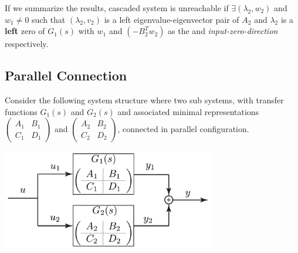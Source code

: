 \documentclass[twoside]{article}
\begin{document}
If we summarize the results, cascaded system is unreachable if $\exists (\lambda_2 , w_2)$ and $w_1 \neq 0$
such that $(\lambda_2 , v_2)$ is a left eigenvalue-eigenvector pair of $A_2$ and $\lambda_2$ is a \textbf{left} zero of 
$G_1(s)$ with $w_1$ and $(-B_2^T w_2)$ as the  and \textit{input-zero-direction} respectively. 

\subsection{Parallel Connection}
		
Consider the following system structure where two sub systems, with transfer functions 
$G_1(s)$ and $G_2(s)$ and associated minimal representations $\left( \begin{array}{c|c} A_1 & B_1 \\ \hline
C_1 & D_1 \end{array} \right)$ and $\left( \begin{array}{c|c} A_2 & B_2 \\ \hline
C_2 & D_2 \end{array} \right)$, connected in parallel configuration. 
		
\begin{center}
  \begin{minipage}[h]{0.9\linewidth}
    \begin{center}
      \includegraphics[width=0.70\textwidth]{parallel}
    \end{center}
  \end{minipage}
    \end{center}
		
\end{document}
